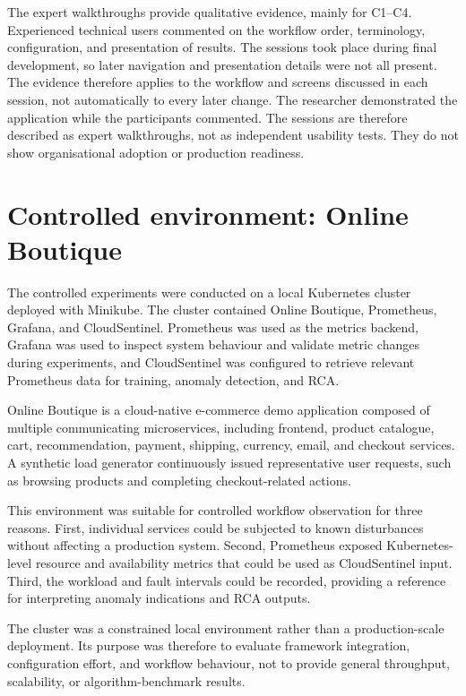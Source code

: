 The expert walkthroughs provide qualitative evidence, mainly for C1--C4. Experienced technical users commented on the workflow order, terminology, configuration, and presentation of results. The sessions took place during final development, so later navigation and presentation details were not all present. The evidence therefore applies to the workflow and screens discussed in each session, not automatically to every later change. The researcher demonstrated the application while the participants commented. The sessions are therefore described as expert walkthroughs, not as independent usability tests. They do not show organisational adoption or production readiness.

\section{Controlled environment: Online Boutique}
The controlled experiments were conducted on a local Kubernetes cluster deployed with Minikube. The cluster contained Online Boutique, Prometheus, Grafana, and CloudSentinel. Prometheus was used as the metrics backend, Grafana was used to inspect system behaviour and validate metric changes during experiments, and CloudSentinel was configured to retrieve relevant Prometheus data for training, anomaly detection, and RCA.

Online Boutique is a cloud-native e-commerce demo application composed of multiple communicating microservices, including frontend, product catalogue, cart, recommendation, payment, shipping, currency, email, and checkout services. A synthetic load generator continuously issued representative user requests, such as browsing products and completing checkout-related actions.

This environment was suitable for controlled workflow observation for three reasons. First, individual services could be subjected to known disturbances without affecting a production system. Second, Prometheus exposed Kubernetes-level resource and availability metrics that could be used as CloudSentinel input. Third, the workload and fault intervals could be recorded, providing a reference for interpreting anomaly indications and RCA outputs.

The cluster was a constrained local environment rather than a production-scale deployment. Its purpose was therefore to evaluate framework integration, configuration effort, and workflow behaviour, not to provide general throughput, scalability, or algorithm-benchmark results.

